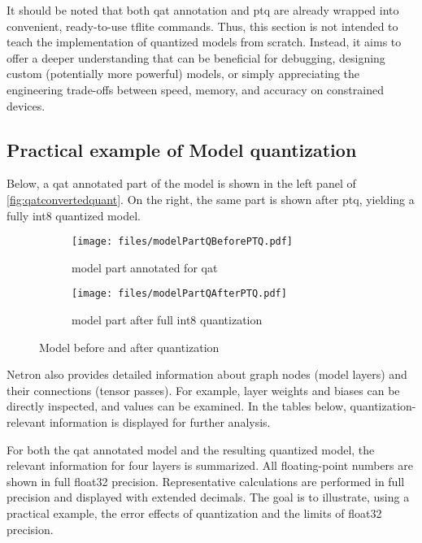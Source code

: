 {It should be noted that both \gls{qat} annotation and \gls{ptq} are already wrapped into convenient, ready-to-use \gls{tflite} commands.
Thus, this section is not intended to teach the implementation of quantized models from scratch. Instead, it aims to offer a deeper understanding that can be beneficial for debugging, designing custom (potentially more powerful) models, or simply appreciating the engineering trade-offs between speed, memory, and accuracy on constrained devices.

\subsection{Practical example of Model quantization}
\label{subsubsec:optquant}

Below, a \gls{qat} annotated part of the model is shown in the left panel of \autoref{fig:qatconvertedquant}.
On the right, the same part is shown after \gls{ptq}, yielding a fully \gls{int8} quantized model.

\begin{figure}[H]
  \centering
  \begin{subfigure}[t]{0.48\textwidth}
    \centering
    \texttt{[image: files/modelPartQBeforePTQ.pdf]}
    \caption{model part annotated for \protect\gls{qat}}
  \end{subfigure}
  \hfill
  \begin{subfigure}[t]{0.48\textwidth}
    \centering
    \texttt{[image: files/modelPartQAfterPTQ.pdf]}
    \caption{model part after full \protect\gls{int8} quantization}
  \end{subfigure}
  \caption{Model before and after quantization}
  \label{fig:qatconvertedquant}
\end{figure}

Netron also provides detailed information about graph nodes (model layers) and their connections (tensor passes).
For example, layer weights and biases can be directly inspected, and values can be examined.
In the tables below, quantization-relevant information is displayed for further analysis.

For both the \gls{qat} annotated model and the resulting quantized model, the relevant information for four layers is summarized.
All floating-point numbers are shown in full \gls{float32} precision.
Representative calculations are performed in full precision and displayed with extended decimals.
The goal is to illustrate, using a practical example, the error effects of quantization and the limits of \gls{float32} precision.

}
